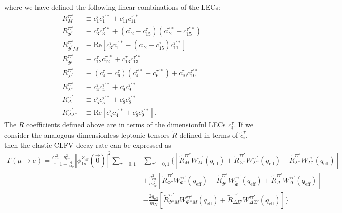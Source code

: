 \documentclass{book}[letterpaper,12pt]
\begin{document}
where we have defined the following linear combinations of the LECs:
\begin{equation}
\begin{split}
R_M^{\tau\tau'}&\equiv c_1^{\tau}c_1^{\tau'*}+c_{11}^{\tau}c_{11}^{\tau'*}\\
R_{\Phi^{''}}^{\tau\tau'}&\equiv c_3^{\tau}c_3^{\tau'*}+\left(c^{\tau}_{12}-c_{15}^{\tau}\right)\left(c_{12}^{\tau'*}-c_{15}^{\tau'*}\right)\\
R^{\tau\tau'}_{\Phi^{''}M}&\equiv \mathrm{Re}\left[c_3^{\tau}c_1^{\tau'*}-(c_{12}^{\tau}-c_{15}^{\tau})c_{11}^{\tau'*}\right]\\
R_{\tilde{\Phi}'}^{\tau\tau'}&\equiv c_{12}^{\tau}c_{12}^{\tau'*}+c_{13}^{\tau}c_{13}^{\tau'*}\\
R_{\Sigma^{''}}^{\tau\tau'}&\equiv (c_4^{\tau}-c_6^{\tau})(c_4^{\tau'*}-c_6^{\tau'*})+c_{10}^{\tau}c_{10}^{\tau'*}\\
R_{\Sigma'}^{\tau\tau'}&\equiv c_4^{\tau}c_4^{\tau'*}+c_9^{\tau}c_9^{\tau'*}\\
R_{\Delta}^{\tau\tau'}&\equiv c_5^{\tau}c_5^{\tau'*}+c_8^{\tau}c_8^{\tau'*}\\
R_{\Delta\Sigma'}^{\tau\tau'}&\equiv \mathrm{Re}\left[c_5^{\tau}c_4^{\tau'*}+c_8^{\tau}c_9^{\tau'*}\right].
\end{split}
\end{equation}
The $R$ coefficients defined above are in terms of the dimensionful LECs $c_i^{\tau}$. If we consider the analogous dimensionless leptonic tensors $\tilde{R}$ defined in terms of $\tilde{c}_i^{\tau}$, then the elastic CLFV decay rate can be expressed as 
\begin{equation}
\begin{split}
\Gamma\left(\mu\rightarrow e\right)=\frac{G_F^2}{\pi}\frac{q_\mathrm{eff}^2}{1+\frac{q}{M_T}}|\phi_{1s}^{Z_\mathrm{eff}}(\vec{0})|^2\sum_{\tau=0,1}&\sum_{\tau'=0,1}\Bigg\{\left[\tilde{R}_M^{\tau\tau'}W_M^{\tau\tau'}(q_\mathrm{eff})+\tilde{R}_{\Sigma''}^{\tau\tau'}W_{\Sigma''}^{\tau\tau'}(q_\mathrm{eff})+\tilde{R}_{\Sigma'}^{\tau\tau'}W_{\Sigma'}^{\tau\tau'}(q_\mathrm{eff})\right]\\
&+\frac{q_\mathrm{eff}^2}{m_N^2}\left[\tilde{R}_{\Phi''}^{\tau\tau'}W_{\Phi''}^{\tau\tau'}(q_\mathrm{eff})+\tilde{R}_{\tilde{\Phi}'}^{\tau\tau'}W_{\tilde{\Phi}'}^{\tau\tau'}(q_\mathrm{eff})+\tilde{R}_{\Delta}^{\tau\tau'}W_{\Delta}^{\tau\tau'}(q_\mathrm{eff})\right]\\
&-\frac{2q_\mathrm{eff}}{m_N}\left[\tilde{R}_{\Phi'' M}^{\tau\tau'}W_{\Phi'' M}^{\tau\tau'}(q_\mathrm{eff})+\tilde{R}_{\Delta\Sigma'}^{\tau\tau'}W_{\Delta\Sigma'}^{\tau\tau'}(q_\mathrm{eff})\right]\Bigg\}
\end{split}
\label{eq:mu2e_rate}
\end{equation}
\end{document}
